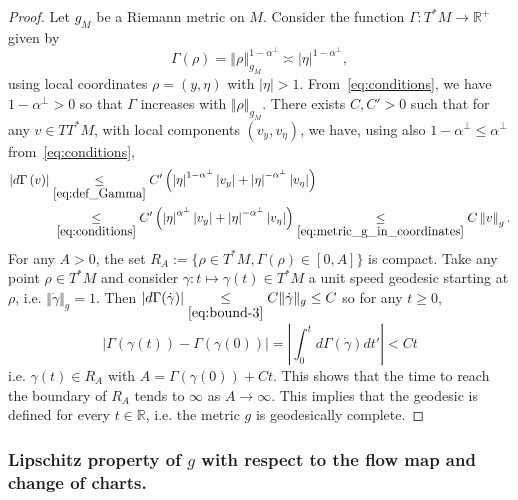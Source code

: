 \documentclass[AHL,Unicode,longabstracts,published]{cedram}
\newcommand{\bbR}{\mathbb{R}}
\newcommand{\bbR}{\mathbb{R}}
\begin{document}
\begin{proof}
Let $g_{M}$ be a Riemann metric on $M$. Consider the function $\Gamma:T^{*}M\rightarrow\bbR^{+}$ given by
\begin{equation}\label{eq:def_Gamma}
\Gamma\left(\rho\right)=\left\Vert \rho\right\Vert _{g_{M}}^{1-\alpha^{\perp}}\asymp\left|\eta\right|^{1-\alpha^{\perp}},
\end{equation}
using local coordinates $\rho=(y,\eta)$ with $|\eta|>1$. From~\eqref{eq:conditions}, we have $1-\alpha^{\perp}>0$ so that $\Gamma$ increases with $\Vert \rho\Vert _{g_{M}}$. There exists $C,C'>0$ such that for any $v\in TT^{*}M$, with local components $(v_{y},v_{\eta})$, we have, using also $1-\alpha^{\perp}\leq\alpha^{\perp}$ from~\eqref{eq:conditions},
\begin{equation}\label{eq:bound-3}
\begin{split}
\left|d\Gamma\left(v\right)\right|&\underset{\eqref{eq:def_Gamma}}{\leq}C'\left(\left|\eta\right|^{1-\alpha^{\perp}}\left|v_{y}\right|+\left|\eta\right|^{-\alpha^{\perp}}\left|v_{\eta}\right|\right)\\
&\;\underset{\eqref{eq:conditions}}{\leq}C'\left(\left|\eta\right|^{\alpha^{\perp}}\left|v_{y}\right|+\left|\eta\right|^{-\alpha^{\perp}}\left|v_{\eta}\right|\right)\underset{\eqref{eq:metric_g_in_coordinates}}{\leq}C\left\Vert v\right\Vert _{g}.
\end{split}
\end{equation}
For any $A>0$, the set $R_{A}:=\{ \rho\in T^{*}M,\Gamma(\rho)\in[0,A]\} $ is compact. Take any point $\rho\in T^{*}M$ and consider $\gamma:t\mapsto\gamma(t)\in T^{*}M$ a unit speed geodesic starting at $\rho$, i.e. $\Vert \dot{\gamma}\Vert _{g}=1$. Then $|d\Gamma(\dot{\gamma})|\underset{\eqref{eq:bound-3}}{\leq}C\Vert \dot{\gamma}\Vert _{g}\leq C$ so for any $t\geq0$,
\[
\big|\Gamma\left(\gamma\left(t\right)\right)-\Gamma\left(\gamma\left(0\right)\right)\big|=\left|\int_{0}^{t}d\Gamma\left(\dot{\gamma}\right)dt'\right|<Ct
\]
i.e. $\gamma(t)\in R_{A}$ with $A=\Gamma(\gamma(0))+Ct$. This shows that the time to reach the boundary of $R_{A}$ tends to $\infty$ as $A\rightarrow\infty$. This implies that the geodesic is defined for every $t\in\bbR$, i.e. the metric $g$ is geodesically complete.
\end{proof}

\subsubsection{\label{subsec:Lipschitz-property-of}
Lipschitz property of \texorpdfstring{$g$}{g} with respect to the flow map and change of charts.}
\end{document}
